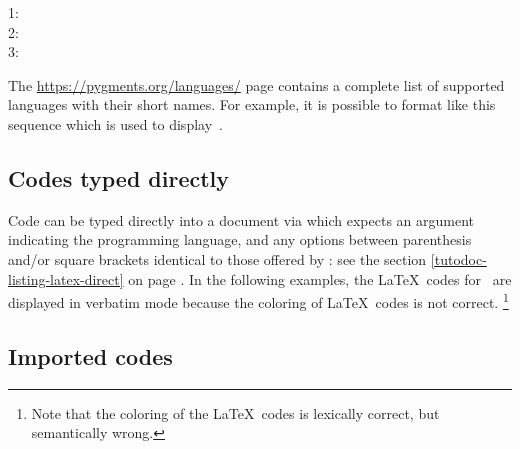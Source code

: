 \begin{tdoclatex}
1:              \\
2:  \\
3: 
\end{tdoclatex}

\medskip

\begin{tdocnote}
	The \url{https://pygments.org/languages/} page contains a complete list of supported languages with their short names.
	For example, it is possible to format \brainfuck like this sequence  which is used to display \,.
\end{tdocnote}



\subsection{Codes typed directly}

Code can be typed directly into a document via  which expects an argument indicating the programming language, and any options between parenthesis and/or square brackets identical to those offered by : see the section \ref{tutodoc-listing-latex-direct} on page \pageref{tutodoc-listing-latex-direct}.
In the following examples, the \LaTeX\ codes for \thisproj\ are displayed in verbatim mode because the coloring of \LaTeX\ codes is not correct.%
\footnote{
	Note that the coloring of the \LaTeX\ codes is lexically correct, but semantically wrong.
}


\begin{tdocexa}
	\leavevmode
\end{tdocexa}


\begin{tdocexa}
	\leavevmode
\end{tdocexa}


\subsection{Imported codes}

